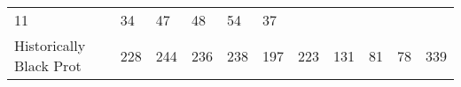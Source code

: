 \documentclass[]{article}
\begin{document}
\begin{longtable}[]{@{}lllllllllll@{}}
\begin{minipage}[t]{0.05\columnwidth}
11\strut
\end{minipage} & \begin{minipage}[t]{0.05\columnwidth}\raggedright
34\strut
\end{minipage} & \begin{minipage}[t]{0.06\columnwidth}\raggedright
47\strut
\end{minipage} & \begin{minipage}[t]{0.06\columnwidth}\raggedright
48\strut
\end{minipage} & \begin{minipage}[t]{0.04\columnwidth}\raggedright
54\strut
\end{minipage} & \begin{minipage}[t]{0.11\columnwidth}\raggedright
37\strut
\end{minipage}\tabularnewline
\begin{minipage}[t]{0.14\columnwidth}\raggedright
Historically Black Prot\strut
\end{minipage} & \begin{minipage}[t]{0.04\columnwidth}\raggedright
228\strut
\end{minipage} & \begin{minipage}[t]{0.05\columnwidth}\raggedright
244\strut
\end{minipage} & \begin{minipage}[t]{0.05\columnwidth}\raggedright
236\strut
\end{minipage} & \begin{minipage}[t]{0.05\columnwidth}\raggedright
238\strut
\end{minipage} & \begin{minipage}[t]{0.05\columnwidth}\raggedright
197\strut
\end{minipage} & \begin{minipage}[t]{0.05\columnwidth}\raggedright
223\strut
\end{minipage} & \begin{minipage}[t]{0.06\columnwidth}\raggedright
131\strut
\end{minipage} & \begin{minipage}[t]{0.06\columnwidth}\raggedright
81\strut
\end{minipage} & \begin{minipage}[t]{0.04\columnwidth}\raggedright
78\strut
\end{minipage} & \begin{minipage}[t]{0.11\columnwidth}\raggedright
339\strut
\end{minipage}\tabularnewline

\end{longtable}
\end{document}
